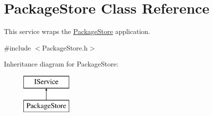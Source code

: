 \hypertarget{class_package_store}{}\section{Package\+Store Class Reference}
\label{class_package_store}


This service wraps the \hyperlink{class_package_store}{Package\+Store} application.  




{\ttfamily \#include $<$Package\+Store.\+h$>$}

Inheritance diagram for Package\+Store\+:\begin{figure}[H]
\begin{center}
\leavevmode
\includegraphics[height=2.000000cm]{class_package_store}
\end{center}
\end{figure}
